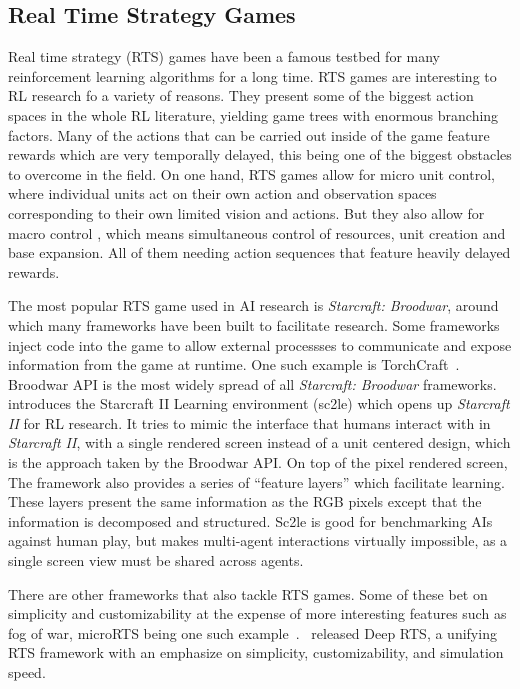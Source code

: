 \subsection{Real Time Strategy Games}

Real time strategy (RTS) games have been a famous testbed for many reinforcement learning algorithms for a long time. RTS games are interesting to RL research fo a variety of reasons. They present some of the biggest action spaces in the whole RL literature, yielding game trees with enormous branching factors. Many of the actions that can be carried out inside of the game feature rewards which are very temporally delayed, this being one of the biggest obstacles to overcome in the field. On one hand, RTS games allow for micro unit control, where individual units act on their own action and observation spaces corresponding to their own limited vision and actions. But they also allow for macro control \citep{Wender2012}, which means simultaneous control of resources, unit creation and base expansion. All of them needing action sequences that feature heavily delayed rewards.

The most popular RTS game used in AI research is \textit{Starcraft: Broodwar}, around which many frameworks have been built to facilitate research. Some frameworks inject code into the game to allow external processses to communicate and expose information from the game at runtime. One such example is TorchCraft~\citep{Synnaeve2016}. Broodwar API \citep{Broodwar} is the most widely spread of all \textit{Starcraft: Broodwar} frameworks.~\citep{Vinyals2017} introduces the Starcraft II Learning environment (sc2le) which opens up \textit{Starcraft II} for RL research. It tries to mimic the interface that humans interact with in \textit{Starcraft II}, with a single rendered screen instead of a unit centered design, which is the approach taken by the Broodwar API. On top of the pixel rendered screen, The framework also provides a series of ``feature layers'' which facilitate learning. These layers present the same information as the RGB pixels except that the information is decomposed and structured. Sc2le is good for benchmarking AIs against human play, but makes multi-agent interactions virtually impossible, as a single screen view must be shared across agents.

There are other frameworks that also tackle RTS games. Some of these bet on simplicity and customizability at the expense of more interesting features such as fog of war, microRTS being one such example~\citep{Ontanon2013}.~\cite{Andersen2017} released Deep RTS, a unifying RTS framework with an emphasize on simplicity, customizability, and simulation speed. 
